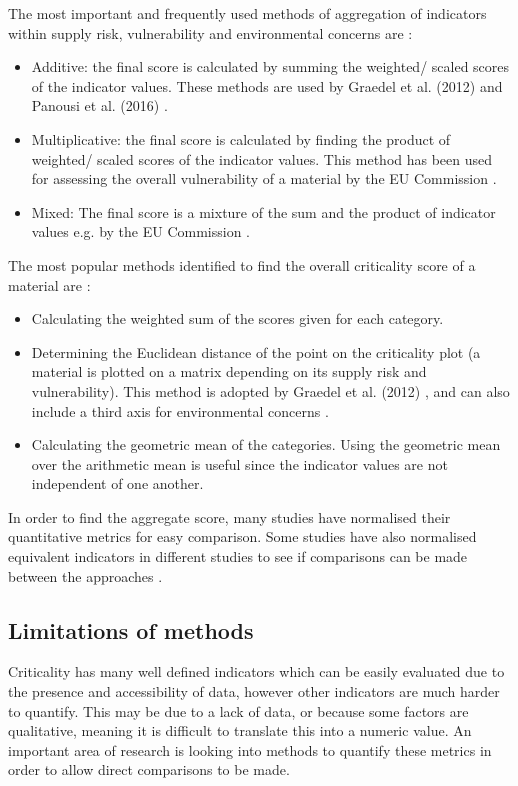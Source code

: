 \documentclass{article}
\begin{document}
The most important and frequently used methods of aggregation of indicators within supply risk, vulnerability and environmental concerns are \cite{frenzel2017raw}: 
\begin{itemize}
    \item Additive: the final score is calculated by summing the weighted/ scaled scores of the indicator values. These methods are used by Graedel et al. (2012) \cite{doi:10.1021/es203534z} and Panousi et al. (2016) \cite{panousi}. 
    \item Multiplicative: the final score is calculated by finding the product of weighted/ scaled scores of the indicator values. This method has been used for assessing the overall vulnerability of a material by the EU Commission \cite{entr2014report}.
    \item Mixed: The final score is a mixture of the sum and the product of indicator values e.g. by the EU Commission \cite{entr2014report}. 
\end{itemize}

The most popular methods identified to find the overall criticality score of a material are \cite{frenzel2017raw}:
\begin{itemize}
    \item Calculating the weighted sum of the scores given for each category.
    \item Determining the Euclidean distance of the point on the criticality plot (a material is plotted on a matrix depending on its supply risk and vulnerability). This method is adopted by Graedel et al. (2012) \cite{doi:10.1021/es203534z}, and can also include a third axis for environmental concerns \cite{nrc2008minerals}.
    \item Calculating the geometric mean of the categories. Using the geometric mean over the arithmetic mean is useful since the indicator values are not independent of one another. 
\end{itemize}

In order to find the aggregate score, many studies have normalised their quantitative metrics for easy comparison. Some studies have also normalised equivalent indicators in different studies to see if comparisons can be made between the approaches \cite{helbig2021overview}. 


\subsection{Limitations of methods}
Criticality has many well defined indicators which can be easily evaluated due to the presence and accessibility of data, however other indicators are much harder to quantify. This may be due to a lack of data, or because some factors are qualitative, meaning it is difficult to translate this into a numeric value. An important area of research is looking into methods to quantify these metrics in order to allow direct comparisons to be made.
\end{document}
